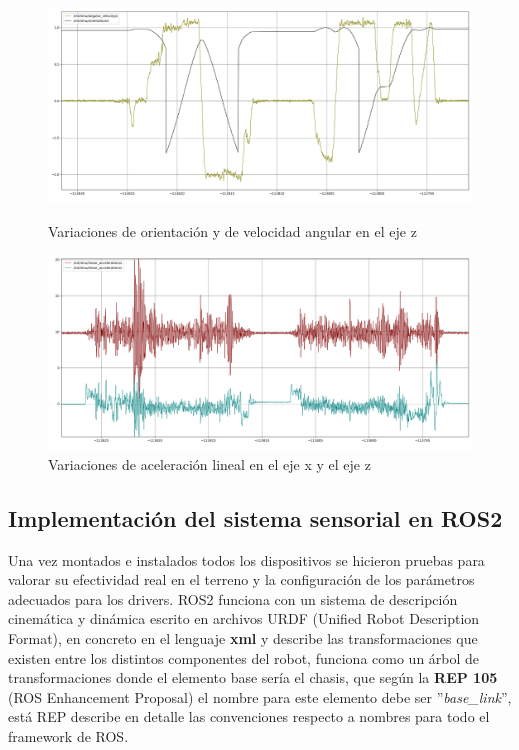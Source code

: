 \begin{figure}[htbp]
  \centering
  \begin{minipage}[b]{0.45\textwidth}
    \centering
    \includegraphics[width=\textwidth]{images/mti_angular_orientation.png}
    \caption{Variaciones de orientación y de velocidad angular en el eje z}
    \label{fig:mti_velocidad_orientacion}
  \end{minipage}
  \hfill
  \begin{minipage}[b]{0.45\textwidth}
    \centering
    \includegraphics[width=\textwidth]{images/mti_Acceleration.png}
    \caption{Variaciones de aceleración lineal en el eje x y el eje z}
    \label{fig:mti_aceleraciones}
  \end{minipage}
\end{figure}

\newpage
\subsection{Implementación del sistema sensorial en ROS2}

Una vez montados e instalados todos los dispositivos se hicieron pruebas para valorar su efectividad real en el terreno y la configuración 
de los parámetros adecuados para los drivers. ROS2 funciona con un sistema de descripción cinemática y dinámica escrito en archivos URDF (Unified Robot Description Format), en concreto en 
el lenguaje \textbf{xml} y describe las transformaciones que existen entre los distintos componentes del robot, funciona como un árbol de 
transformaciones donde el elemento base sería el chasis, que según la \textbf{REP 105} (ROS Enhancement Proposal) el nombre para este 
elemento debe ser ''\textit{base\_link}'', está REP describe en detalle las convenciones respecto a nombres para todo el framework de ROS. 

